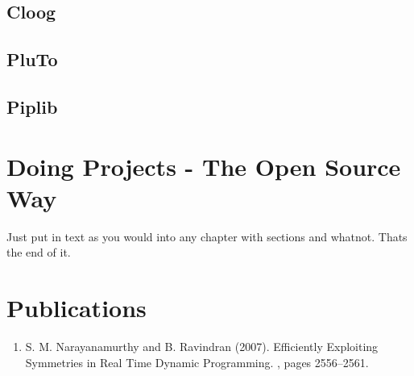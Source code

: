 \documentclass[MTech]{iitmdiss}
\begin{document}
\section{Cloog}
\section{PluTo}
\section{Piplib}

\chapter{Doing Projects - The Open Source Way}
 
 Just put in text as you would into any chapter with sections and
 whatnot.  Thats the end of it.


\chapter*{Publications}
\vspace{-0.3cm}

\begin{enumerate}
\item S. M. Narayanamurthy and B. Ravindran (2007). \newblock
  Efficiently Exploiting Symmetries in Real Time Dynamic Programming. , pages 2556--2561.
\end{enumerate}


\pagebreak
\begin{singlespace}
  \begin{small}
	
  \end{small}
\end{singlespace}

\end{document}
